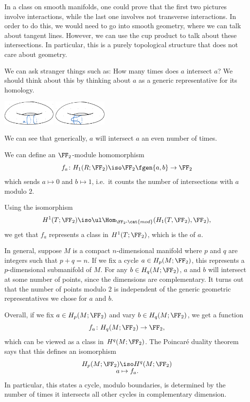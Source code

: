 \documentclass{standalone}
\begin{document}
In a class on smooth manifolds, one could prove that the first two pictures
involve  interactions, while the last one involves
not transverse interactions.
In order to do this, we would need to go into smooth geometry,
where we can talk about tangent lines.
However, we can use the cup product to talk about these intersections.
In particular, this is a purely topological structure
that does not care about geometry.

We can ask stranger things such as: How many times does \(a\) intersect \(a\)?
We should think about this by thinking about \(a\) as a generic representative
for its homology.
\begin{center}
  \includegraphics[width=0.2\textwidth]{18_905-201120-5.png}
  \qquad
  \includegraphics[width=0.2\textwidth]{18_905-201120-6.png}
\end{center}
We can see that generically, \(a\) will intersect \(a\)
an even number of times.

We can define an \(\FF_2\)-module homomorphism
\[
  f_a \colon H_1(R; \FF_2) \iso \FF_2\fgen{a, b} \to \FF_2
\]
which sends \(a \mapsto 0\) and \(b \mapsto 1\),
i.e.\ it counts the number of intersections with \(a\) modulo \(2\).

Using the isomorphism
\[
  H^1(T; \FF_2)
    \iso \ul\Hom_{\FF_2\text{-}\cat{mod}}(H_1(T, \FF_2), \FF_2), %
\]
we get that \(f_a\) represents a class in \(H^1(T; \FF_2)\),
which is the  of \(a\).


In general, suppose \(M\) is a compact \(n\)-dimensional manifold
where \(p\) and \(q\) are integers such that \(p + q = n\).
If we fix a cycle \(a \in H_p(M; \FF_2)\),
this represents a \(p\)-dimensional submanifold of \(M\).
For any \(b \in H_q(M; \FF_2)\),
\(a\) and \(b\) will intersect at some number
of points, since the dimensions are complementary.
It turns out that the number of points modulo \(2\) is independent
of the generic geometric representatives we chose for \(a\) and \(b\).

Overall, if we fix \(a \in H_p(M; \FF_2)\) and vary \(b \in H_q(M; \FF_2)\),
we get a function
\[
  f_a \colon H_q(M; \FF_2) \to \FF_2,
\]
which can be viewed as a class in \(H^q(M; \FF_2)\).
The Poincar\'e duality theorem says that this defines an isomorphism
\begin{align*}
  H_p(M; \FF_2) &\iso H^q(M; \FF_2) \\[-1ex]
    a &\mapsto f_a.
\end{align*}
In particular, this states a cycle, modulo boundaries,
is determined by the number of times it intersects all other cycles
in complementary dimension.
\end{document}
